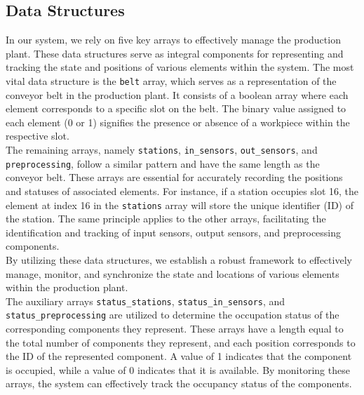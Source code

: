 \documentclass[11pt, oneside]{article}
\begin{document}
\subsection{Data Structures}
In our system, we rely on five key arrays to effectively manage the production plant. These data structures serve as integral components for representing and tracking the state and positions of various elements within the system.
The most vital data structure is the \texttt{belt} array, which serves as a representation of the conveyor belt in the production plant. It consists of a boolean array where each element corresponds to a specific slot on the belt. The binary value assigned to each element (0 or 1) signifies the presence or absence of a workpiece within the respective slot.\\
The remaining arrays, namely \texttt{stations}, \texttt{in\_sensors}, \texttt{out\_sensors}, and \texttt{preprocessing}, follow a similar pattern and have the same length as the conveyor belt. These arrays are essential for accurately recording the positions and statuses of associated elements. For instance, if a station occupies slot 16, the element at index 16 in the \texttt{stations} array will store the unique identifier (ID) of the station. The same principle applies to the other arrays, facilitating the identification and tracking of input sensors, output sensors, and preprocessing components.\\
By utilizing these data structures, we establish a robust framework to effectively manage, monitor, and synchronize the state and locations of various elements within the production plant.\\
The auxiliary arrays \texttt{status\_stations}, \texttt{status\_in\_sensors}, and \texttt{status\_preprocessing} are utilized to determine the occupation status of the corresponding components they represent. These arrays have a length equal to the total number of components they represent, and each position corresponds to the ID of the represented component. A value of 1 indicates that the component is occupied, while a value of 0 indicates that it is available. By monitoring these arrays, the system can effectively track the occupancy status of the components.
\end{document}
